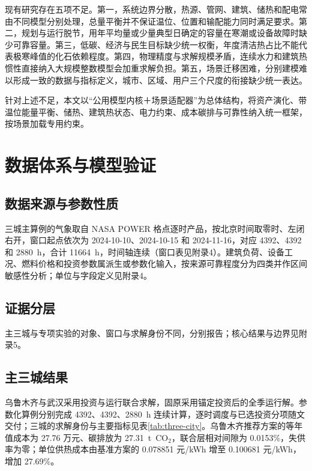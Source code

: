 \documentclass[12pt,a4paper]{article}
\begin{document}
现有研究存在五项不足。第一，系统边界分散，热源、管网、建筑、储热和配电常由不同模型分别处理，总量平衡并不保证温位、位置和输配能力同时满足要求。第二，规划与运行脱节，用年平均量或少量典型日确定的容量在寒潮或设备故障时缺少可靠容量。第三，低碳、经济与民生目标缺少统一权衡，年度清洁热占比不能代表极寒峰值的化石依赖程度。第四，物理精度与求解规模矛盾，连续水力和建筑热惯性直接纳入大规模整数模型会加重求解负担。第五，场景迁移困难，分别建模难以形成一致的数据与指标定义，城市、区域、用户三个尺度的衔接缺少统一表达。

针对上述不足，本文以“公用模型内核＋场景适配器”为总体结构，将资产演化、带温位能量平衡、储热、建筑热状态、电力约束、成本碳排与可靠性纳入统一框架，按场景加载专用约束。


\clearpage


\clearpage


\clearpage
\section{数据体系与模型验证}\label{minor:data}

\subsection{数据来源与参数性质}

三城主算例的气象取自 NASA POWER 格点逐时产品，按北京时间取零时、左闭右开，窗口起点依次为 2024-10-10、2024-10-15 和 2024-11-16，对应 4392、4392 和 2880~h，合计 11664~h，时间轴连续（窗口表见附录4）。建筑负荷、设备工况、燃料价格和投资参数属派生或参数化输入，按来源可靠程度分为四类并作区间敏感性分析；单位与字段定义见附录4。

\subsection{证据分层}

主三城与专项实验的对象、窗口与求解身份不同，分别报告；核心结果与边界见附录5。



\subsection{主三城结果}

乌鲁木齐与武汉采用投资与运行联合求解，固原采用锚定投资后的全季运行解。参数化算例分别完成 4392、4392、2880~h 连续计算，逐时调度与已选投资分项随文交付；三城的求解身份与主要指标见表\ref{tab:three-city}。乌鲁木齐推荐方案的等年值成本为 27.76 万元、碳排放为 27.31~t~CO$_2$，联合层相对间隙为 0.0153\%，失供率为零；单位供热成本由基准方案的 0.078851 元/kWh 增至 0.100681 元/kWh，增加 27.69\%。
\end{document}
